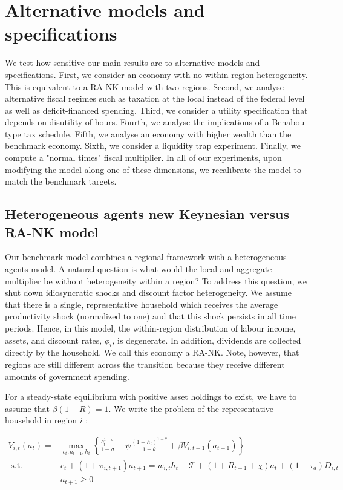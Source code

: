 \documentclass[\latexroot/\projectname]{subfiles}
\begin{document}
\FloatBarrier
\hypertarget{robustness}{}

\section*{Alternative models and specifications}
\whenintegrated{\label{sec:robustness}} %

We test how sensitive our main results are to alternative models and specifications. First, we consider an economy with no within-region heterogeneity. This is equivalent to a RA-NK model with two regions. Second, we analyse alternative fiscal regimes such as taxation at the local instead of the federal level as well as deficit-financed spending. Third, we consider a utility specification that depends on disutility of hours. Fourth, we analyse the implications of a Benabou-type tax schedule. Fifth, we analyse an economy with higher wealth than the benchmark economy. Sixth, we consider a liquidity trap experiment. Finally, we compute a "normal times" fiscal multiplier. In all of our experiments, upon modifying the model along one of these dimensions, we recalibrate the model to match the benchmark targets.

\subsection{Heterogeneous agents new Keynesian versus RA-NK model}
Our benchmark model combines a regional framework with a heterogeneous agents model. A natural question is what would the local and aggregate multiplier be without heterogeneity within a region? To address this question, we shut down idiosyncratic shocks and discount factor heterogeneity. We assume that there is a single, representative household which receives the average productivity shock (normalized to one) and that this shock persists in all time periods. Hence, in this model, the within-region distribution of labour income, assets, and discount rates, $\phi_{i}$, is degenerate. In addition, dividends are collected directly by the household. We call this economy a RA-NK. Note, however, that regions are still different across the transition because they receive different amounts of government spending.

For a steady-state equilibrium with positive asset holdings to exist, we have to assume that $\beta(1+R)=1$. We write the problem of the representative household in region $i$ :


\begin{align*}
V_{i, t}\left(a_{t}\right)= & \max _{c_{t}, a_{t+1}, h_{t}}\left\{\frac{c_{t}^{1-\sigma}}{1-\sigma}+\psi \frac{\left(1-h_{t}\right)^{1-\theta}}{1-\theta}+\beta V_{i, t+1}\left(a_{t+1}\right)\right\}  \tag{6.1}\\
\text { s.t. } & c_{t}+\left(1+\pi_{i, t+1}\right) a_{t+1}=w_{i, t} h_{t}-\mathcal{T}+\left(1+R_{t-1}+\chi\right) a_{t}+\left(1-\tau_{d}\right) D_{i, t}  \tag{6.2}\\
& a_{t+1} \geq 0 \tag{6.3}
\end{align*}
\end{document}
